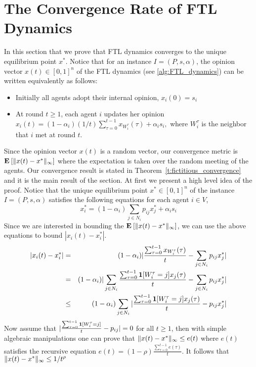\section{The Convergence Rate of FTL Dynamics}\label{s:fictitious_convergence}
In this section that we prove that FTL dynamics
converges to the unique equilibrium point $x^*$.
Notice that for an instance $I=(P,s,\alpha)$, the opinion vector $x(t) \in [0,1]^n$
of the FTL dynamics (see \ref{alg:FTL_dynamics}) can be written equivalently as follows:
\begin{itemize}
 \item Initially all agents adopt their internal opinion, $x_i(0)=s_i$
 \item At round $t \geq 1$, each agent $i$ updates her opinion
 \(
x_i(t)=(1-\alpha_i)(1/t)\sum_{\tau=0}^{t-1} x_{W_i^\tau}(\tau)+ \alpha_i s_i,
\)
where $W_i^\tau$ is the neighbor that $i$ met at round $t$.
\end{itemize}
Since the opinion vector $x(t)$ is a random vector,
our convergence metric is $\bm{\mathrm{E}}_{} \left[ \| x(t) - x^* \|_{\infty} \right]$
where the expectation is taken over the random meeting of the agents.
Our convergence result is stated in Theorem~\ref{t:fictitious_convergence}
and it is the main result of the section.
%
%
At first we present a high level idea of the proof.
Notice that the unique equilibrium point $x^* \in [0,1]^n$ of the
instance $I=(P,s,\alpha)$ satisfies the following equations
for each agent $i \in V$,
\[x_i^*= (1-\alpha_i)\sum_{j \in N_i}p_{ij}x_j^* + \alpha_is_i\]
Since we are interested in bounding the $\bm{\mathrm{E}}_{} \left[ \| x(t)-x^* \|_{\infty} \right]$, we
can use the above equations to bound $|x_i(t)-x_i^*|$.
\begin{eqnarray*}
 |x_i(t)-x_i^*|
 &=& (1-\alpha_i)|\frac{\sum_{\tau=0}^{t-1} x_{W_i^\tau}(\tau)}{t}
 - \sum_{j \in N_i} p_{ij}x_j^*|\\
 &=& (1-\alpha_i)|\sum_{j \in N_i}\frac{\sum_{\tau=0}^{t-1} \bm{1}{\left[W_i^\tau=j\right]}x_j(\tau)}{t}-\sum_{j \in N_i} p_{ij}x_j^*|\\
 &\leq& (1-\alpha_i)\sum_{j \in N_i}|\frac{\sum_{\tau=0}^{t-1} \bm{1}{\left[W_i^\tau=j\right]}x_j(\tau)}{t}- p_{ij}x_j^*|
\end{eqnarray*}
Now assume that $|\frac{\sum_{\tau=0}^{t-1} \bm{1}{\left[W_i^{\tau}=j\right]}}{t}- p_{ij}| = 0$
for all $t\geq 1$, then with simple algebraic manipulations
one can prove that $\| x(t)-x^* \|_{\infty} \leq e(t)$ where $e(t)$
satisfies the recursive equation $e(t) = (1-\rho)\frac{\sum_{\tau=0}^{t-1}e(\tau)}{t}$.
It follows that $\| x(t)-x^* \|_{\infty} \leq 1/t^\rho$
